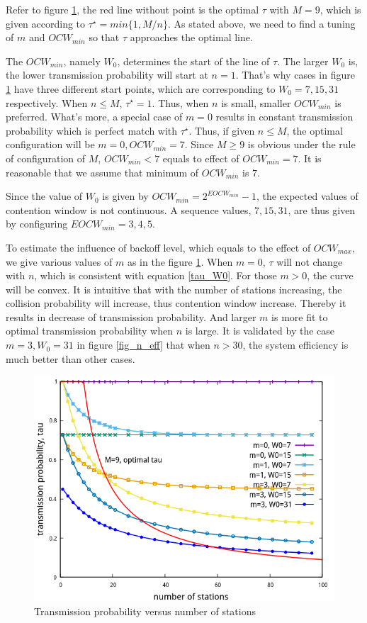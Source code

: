 Refer to figure \ref{fig_n_tau}, the red line without point is the optimal $\tau$ with $M=9$, which is given according to $\tau^\star = min\lbrace 1, M/n \rbrace$.
As stated above, we need to find a tuning of $m$ and $OCW_{min}$ so that $\tau$ approaches the optimal line.

The $OCW_{min}$, namely $W_0$, determines the start of the line of $\tau$. The larger $W_0$ is, the lower transmission probability will start at $n=1$. 
That's why cases in figure \ref{fig_n_tau} have three different start points, which are corresponding to $W_0 = 7,15, 31$ respectively.
When $n \leq M$, $\tau^\star = 1$. Thus, when $n$ is small, smaller $OCW_{min}$ is preferred. What's more, a special case of $m=0$ results in constant transmission probability which is perfect match with $\tau^\star$. 
Thus, if given $n\leq M$, the optimal configuration will be $m=0, OCW_{min} = 7$. Since $M \geq 9$ is obvious under the rule of configuration of $M$, $OCW_{min} < 7$ equals to effect of $OCW_{min} = 7$. It is reasonable that we assume that minimum of $OCW_{min}$ is $7$. 

Since the value of $W_0$ is given by $OCW_{min} = 2^{EOCW_{min}}-1$, the expected values of contention window is not continuous. A sequence values, $7, 15, 31$, are thus given by configuring $EOCW_{min} = 3,4,5$. 


To estimate the influence of backoff level, which equals to the effect of $OCW_{max}$, we give various values of $m$ as in the figure \ref{fig_n_tau}.
When $m=0$, $\tau$ will not change with $n$, which is consistent with equation \ref{tau_W0}.
For those $m>0$, the curve will be convex. It is intuitive that with the number of stations increasing, the collision probability will increase, thus contention window increase. Thereby it results in decrease of transmission probability. 
And larger $m$ is more fit to optimal transmission probability when $n$ is large. 
It is validated by the case $m=3, W_0 = 31$ in figure \ref{fig_n_eff} that when $n > 30$, the system efficiency is much better than other cases.


\begin{figure}[!ht]
\includegraphics[scale=.54]{./figure/n_tau_perf.png}
\caption{Transmission probability versus number of stations}
\label{fig_n_tau}
\end{figure}

